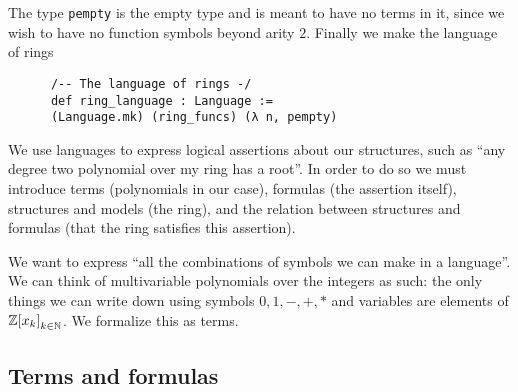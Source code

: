 \begin{dfn}
    The type \texttt{pempty} is the empty type and is meant to have no terms in it,
    since we wish to have no function symbols beyond arity $2$.
    Finally we make the language of rings

    \begin{lstlisting}
      /-- The language of rings -/
      def ring_language : Language :=
      (Language.mk) (ring_funcs) (λ n, pempty)\end{lstlisting}

\end{dfn}

We use languages to express logical assertions about our structures, such as
``any degree two polynomial over my ring has a root''.
In order to do so we must introduce terms (polynomials in our case),
formulas (the assertion itself), structures and models (the ring),
and the relation between structures and formulas
(that the ring satisfies this assertion).

We want to express ``all the combinations of symbols we can make in a language''.
We can think of multivariable polynomials over the integers as such:
the only things we can write down using symbols $0,1,-,+,*$ and variables
are elements of $\mathbb{Z}{[x_{k}]}_{k \in \mathbb{N}}$.
We formalize this as terms.

\subsection{Terms and formulas}

